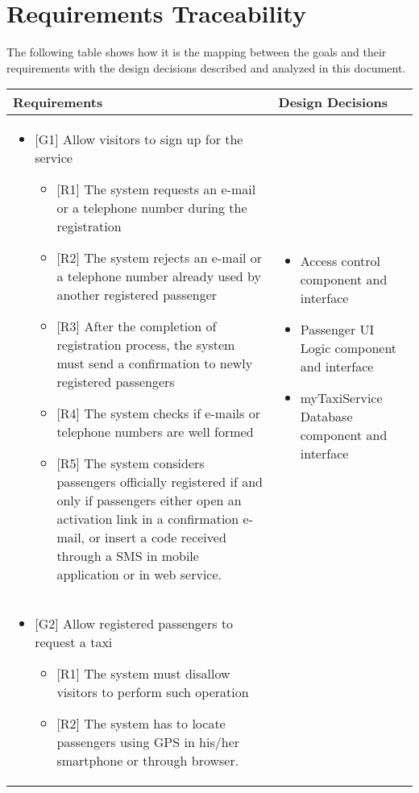 \break
\section{Requirements Traceability}
The following table shows how it is the mapping between the goals and their requirements with the design decisions described and analyzed in this document.
\begin{center}
\def\arraystretch{1.5}
\begin{longtable}{|p{}|p{}|}
	\hline
	Requirements & Design Decisions \\
	\hline\MPtrue
	\begin{itemize}
		\item {[}G1{]} Allow visitors to sign up for the service
	\begin{itemize}
		\item {[}R1{]} The system requests an e-mail or a telephone number during the registration
		\item {[}R2{]} The system rejects an e-mail or a telephone number already used by another registered passenger
		\item {[}R3{]} After the completion of registration process, the system must send a confirmation to newly registered passengers
		\item {[}R4{]} The system checks if e-mails or telephone numbers are well formed
		\item {[}R5{]} The system considers passengers officially registered if and only if passengers either open an activation link in a confirmation e-mail, or insert a code received through a SMS in mobile application or in web service.
	\end{itemize}\end{itemize} & \MPtrue\begin{itemize}
	\item Access control component and interface
	\item Passenger UI Logic component and interface
	\item myTaxiService Database component and interface
	\end{itemize} \\
	\hline\MPtrue
	\begin{itemize}
		\item {[}G2{]} Allow registered passengers to request a taxi
	\begin{itemize}
		\item {[}R1{]} The system must disallow visitors to perform such operation
		\item {[}R2{]} The system has to locate passengers using GPS in his/her smartphone or through browser.

\end{itemize}
\end{itemize}
\end{longtable}
\end{center}
